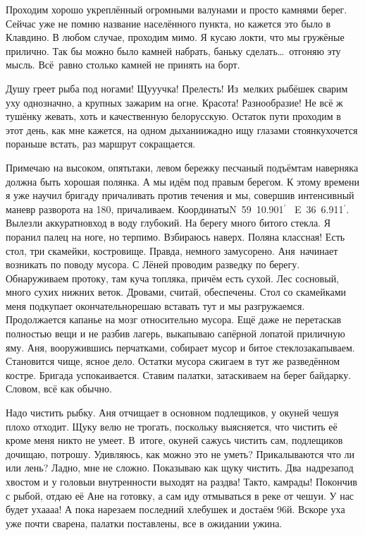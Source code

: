 Проходим хорошо укреплённый огромными валунами и просто камнями берег. Сейчас уже не помню название населённого пункта, но кажется это было в Клавдино. В любом случае, проходим мимо. Я кусаю локти, что мы гружёные прилично. Так бы можно было камней набрать, баньку сделать\ldots~отгоняю эту мысль. Всё~равно столько камней не принять на борт.

Душу греет рыба под ногами! Щу\sdash у\sdash учка! Прелесть! Из~мелких рыбёшек сварим уху однозначно, а крупных зажарим на огне. Красота! Разнообразие! Не всё ж тушёнку жевать, хоть и качественную белорусскую. Остаток пути проходим в этот день, как мне кажется, на одном дыхании\mdash жадно ищу глазами стоянку\mdash хочется пораньше встать, раз маршрут сокращается. 

Примечаю на высоком, опять\sdash таки, левом бережку песчаный подъём\mdash там наверняка должна быть хорошая полянка. А мы идём под правым берегом. К этому времени я уже научил бригаду причаливать против течения и мы, совершив интенсивный маневр разворота на 180\degree, причаливаем. Координаты\mdash N~59\degree~10.901$^\prime$~ E~36\degree~6.911$^\prime$. Вылезли аккуратно\mdash вход в воду глубокий. На берегу много битого стекла. Я поранил палец на ноге, но терпимо. Взбираюсь наверх. Поляна классная! Есть стол, три скамейки, костровище. Правда, немного замусорено. Аня~начинает возникать по поводу мусора. С Лёней проводим разведку по берегу. Обнаруживаем протоку, там куча топляка, причём есть сухой. Лес сосновый, много сухих нижних веток. Дровами, считай, обеспечены. Стол со скамейками меня подкупает окончательно\mdash решаю вставать тут и мы разгружаемся. Продолжается капанье на мозг относительно мусора. Ещё даже не перетаскав полностью вещи и не разбив лагерь, выкапываю сапёрной лопатой приличную яму. Аня, вооружившись перчатками, собирает мусор и битое стекло\mdash закапываем. Становится чище, ясное дело. Остатки мусора сжигаем в тут же разведённом костре. Бригада успокаивается. Ставим палатки, затаскиваем на берег байдарку. Словом, всё как обычно. 

Надо чистить рыбку. Аня отчищает в основном подлещиков, у окуней чешуя плохо отходит. Щуку велю не трогать, поскольку выясняется, что чистить её кроме меня никто не умеет. В~итоге, окуней сажусь чистить сам, подлещиков дочищаю, потрошу. Удивляюсь, как можно это не уметь? Прикалываются что ли или лень? Ладно, мне не сложно. Показываю как щуку чистить. Два~надреза\mdash под хвостом и у головы\mdash и внутренности выходят на раз\sdash два! Так\sdash то, камрады! Покончив с рыбой, отдаю её Ане на готовку, а сам иду отмываться в реке от чешуи. У нас будет уха\sdash а\sdash а\sdash а! А пока нарезаем последний хлебушек и достаём 96\sdash й. Вскоре уха уже почти сварена, палатки поставлены, все в ожидании ужина. 

